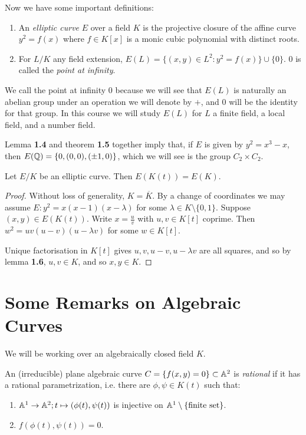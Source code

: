 \documentclass[10pt,a4paper]{article}
\begin{document}
Now we have some important definitions:
\begin{definition}\hspace*{0cm}
  \begin{enumerate}
    \item An \emph{elliptic curve} $E$ over a field $K$ is the projective closure of the affine curve $y^2 = f(x)$ where $f \in K[x]$ is a monic cubic polynomial with distinct roots.
    \item For $L/K$ any field extension, $E(L) = \{ (x,y) \in L^2 : y^2 = f(x)\} \cup \{0\}$. $0$ is called the \emph{point at infinity}.
  \end{enumerate}
\end{definition}
We call the point at infinity $0$ because we will see that $E(L)$ is naturally an abelian group under an operation we will denote by $+$, and $0$ will be the identity for that group. In this course we will study $E(L)$ for $L$ a finite field, a local field, and a number field.

Lemma \textbf{1.4} and theorem \textbf{1.5} together imply that, if $E$ is given by $y^2 = x^3-x$, then $E(\mathbb{Q}) = \{0, (0,0), (\pm 1, 0)\}$, which we will see is the group $C_2\times C_2$.

\begin{corollary}
  Let $E/K$ be an elliptic curve. Then $E(K(t)) = E(K)$.
\end{corollary}
\begin{proof}
  Without loss of generality, $K = \overline{K}$. By a change of coordinates we may assume $E: y^2 = x(x-1)(x-\lambda)$ for some $\lambda \in K\setminus\{0, 1\}$. Suppose $(x, y) \in E(K(t))$. Write $x = \frac{u}{v}$ with $u, v \in K[t]$ coprime. Then $w^2 = uv(u-v)(u-\lambda v)$ for some $w \in K[t]$.

  Unique factorisation in $K[t]$ gives $u, v, u-v, u-\lambda v$ are all squares, and so by lemma \textbf{1.6}, $u, v \in K$, and so $x, y \in K$.
\end{proof}

\section{Some Remarks on Algebraic Curves}
We will be working over an algebraically closed field $K$.
\begin{definition}
  An (irreducible) plane algebraic curve $C = \{f(x, y) = 0\}\subset \mathbb{A}^2$ is \emph{rational} if it has a rational parametrization, i.e. there are $\phi, \psi \in K(t)$ such that:
  \begin{enumerate}
    \item $\mathbb{A}^1 \to \mathbb{A}^2; t \mapsto (\phi(t), \psi(t))$ is injective on $\mathbb{A}^1 \setminus\{\text{finite set}\}$.
    \item $f(\phi(t), \psi(t)) = 0$.
  \end{enumerate}
\end{definition}
\end{document}
